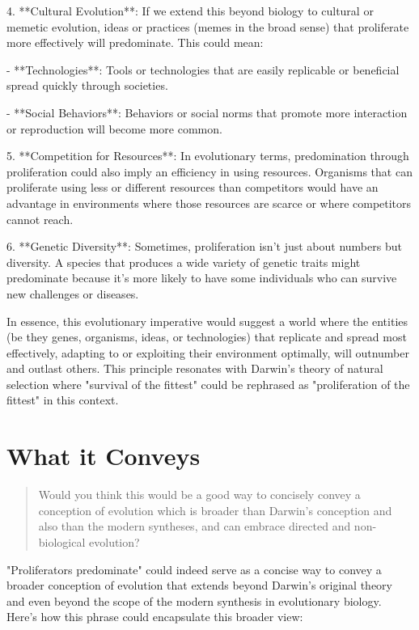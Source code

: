 \documentclass[10pt,titlepage]{book}
\begin{document}
4. **Cultural Evolution**: If we extend this beyond biology to cultural or memetic evolution, ideas or practices (memes in the broad sense) that proliferate more effectively will predominate. This could mean:

   - **Technologies**: Tools or technologies that are easily replicable or beneficial spread quickly through societies.
   
   - **Social Behaviors**: Behaviors or social norms that promote more interaction or reproduction will become more common.

5. **Competition for Resources**: In evolutionary terms, predomination through proliferation could also imply an efficiency in using resources. Organisms that can proliferate using less or different resources than competitors would have an advantage in environments where those resources are scarce or where competitors cannot reach.

6. **Genetic Diversity**: Sometimes, proliferation isn't just about numbers but diversity. A species that produces a wide variety of genetic traits might predominate because it's more likely to have some individuals who can survive new challenges or diseases.

In essence, this evolutionary imperative would suggest a world where the entities (be they genes, organisms, ideas, or technologies) that replicate and spread most effectively, adapting to or exploiting their environment optimally, will outnumber and outlast others. This principle resonates with Darwin's theory of natural selection where "survival of the fittest" could be rephrased as "proliferation of the fittest" in this context.

\section{What it Conveys}

\begin{quote}
Would you think this would be a good way to concisely convey a conception of evolution which is broader than Darwin's conception and also than the modern syntheses, and can embrace directed and non-biological evolution?
  \end{quote}

"Proliferators predominate" could indeed serve as a concise way to convey a broader conception of evolution that extends beyond Darwin's original theory and even beyond the scope of the modern synthesis in evolutionary biology. Here's how this phrase could encapsulate this broader view:
\end{document}
